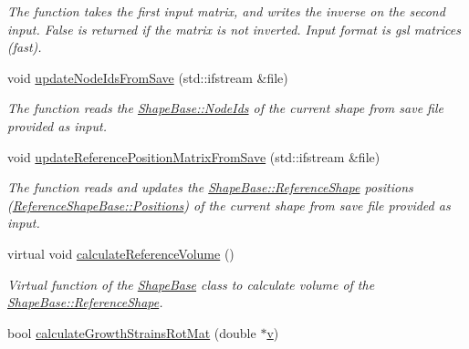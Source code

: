 \begin{DoxyCompactItemize}
\begin{DoxyCompactList}\small\item\em The function takes the first input matrix, and writes the inverse on the second input. False is returned if the matrix is not inverted. Input format is gsl matrices (fast). \end{DoxyCompactList}\item 
\hypertarget{classShapeBase_a92927e610d4e389c32a023554d805fc7}{}void \hyperlink{classShapeBase_a92927e610d4e389c32a023554d805fc7}{update\+Node\+Ids\+From\+Save} (std\+::ifstream \&file)\label{classShapeBase_a92927e610d4e389c32a023554d805fc7}

\begin{DoxyCompactList}\small\item\em The function reads the \hyperlink{classShapeBase_af96e17fa9a23289fb743ff0722a7dc64}{Shape\+Base\+::\+Node\+Ids} of the current shape from save file provided as input. \end{DoxyCompactList}\item 
\hypertarget{classShapeBase_a93a742964154a791aacdae8e783c19c4}{}void \hyperlink{classShapeBase_a93a742964154a791aacdae8e783c19c4}{update\+Reference\+Position\+Matrix\+From\+Save} (std\+::ifstream \&file)\label{classShapeBase_a93a742964154a791aacdae8e783c19c4}

\begin{DoxyCompactList}\small\item\em The function reads and updates the \hyperlink{classShapeBase_a93270dee7f71d075c73d1720c8279a44}{Shape\+Base\+::\+Reference\+Shape} positions (\hyperlink{classReferenceShapeBase_a6b20aebb733d845a8e2b7cd4f69722cb}{Reference\+Shape\+Base\+::\+Positions}) of the current shape from save file provided as input. \end{DoxyCompactList}\item 
\hypertarget{classShapeBase_a39adc8589779388b57622489f370f445}{}virtual void \hyperlink{classShapeBase_a39adc8589779388b57622489f370f445}{calculate\+Reference\+Volume} ()\label{classShapeBase_a39adc8589779388b57622489f370f445}

\begin{DoxyCompactList}\small\item\em Virtual function of the \hyperlink{classShapeBase}{Shape\+Base} class to calculate volume of the \hyperlink{classShapeBase_a93270dee7f71d075c73d1720c8279a44}{Shape\+Base\+::\+Reference\+Shape}. \end{DoxyCompactList}\item 
\hypertarget{classShapeBase_a8bf9c7c8ae6a3195ec9c6b6bdaf847ab}{}bool \hyperlink{classShapeBase_a8bf9c7c8ae6a3195ec9c6b6bdaf847ab}{calculate\+Growth\+Strains\+Rot\+Mat} (double $\ast$\hyperlink{classShapeBase_a8b4c2d3bfbc6c9785c5181a56f929151}{v})\label{classShapeBase_a8bf9c7c8ae6a3195ec9c6b6bdaf847ab}


\end{DoxyCompactItemize}
